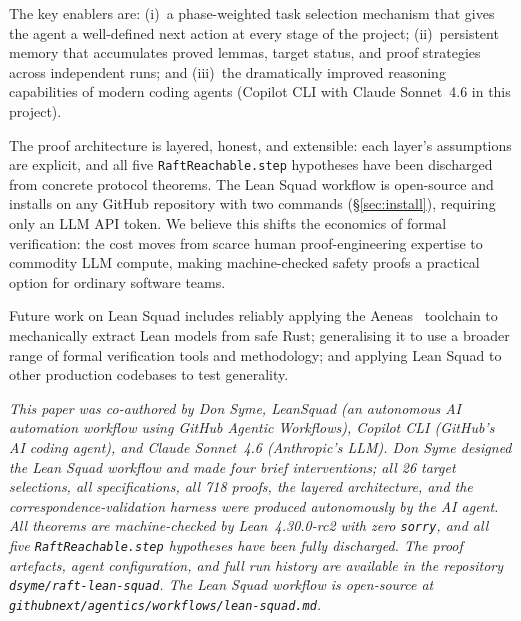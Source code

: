 \documentclass[sigconf,10pt]{acmart}
\begin{document}
The key enablers are: (i)~a phase-weighted task selection mechanism
that gives the agent a well-defined next action at every stage of the
project; (ii)~persistent memory that accumulates proved lemmas,
target status, and proof strategies across independent runs; and
(iii)~the dramatically improved reasoning capabilities of modern
coding agents (Copilot CLI with Claude Sonnet~4.6 in this project).

The proof architecture is layered, honest, and extensible: each layer's
assumptions are explicit, and all five \texttt{RaftReachable.step}
hypotheses have been discharged from concrete protocol theorems.
The Lean Squad workflow is open-source
and installs on any GitHub repository with two commands
(\S\ref{sec:install}), requiring only an LLM API token.
We believe this shifts the economics of formal verification:
the cost moves from scarce human proof-engineering expertise to
commodity LLM compute, making machine-checked safety proofs a
practical option for ordinary software teams.

Future work on Lean Squad includes
reliably applying the Aeneas~\cite{aeneas} toolchain to mechanically
extract Lean models from safe Rust; generalising it to use a broader
range of formal verification tools and methodology; and applying Lean
Squad to other production codebases to test generality.

\begin{acks}
\emph{This paper was co-authored by Don Syme, LeanSquad (an autonomous
AI automation workflow using GitHub Agentic Workflows), Copilot CLI
(GitHub's AI coding agent), and Claude Sonnet~4.6 (Anthropic's LLM).  Don Syme designed the Lean Squad workflow
and made four brief interventions; all 26 target selections, all
specifications, all 718 proofs, the layered architecture, and the
correspondence-validation harness were produced autonomously by the AI
agent.  All theorems are machine-checked by Lean~4.30.0-rc2 with zero
\texttt{sorry}, and all five \texttt{RaftReachable.step} hypotheses
have been fully discharged.  The proof artefacts, agent configuration, and full run
history are available in the repository \texttt{dsyme/raft-lean-squad}.
The Lean Squad workflow is
open-source at \texttt{githubnext/\allowbreak agentics/\allowbreak workflows/\allowbreak lean-squad.md}.}
\end{acks}



\end{document}
